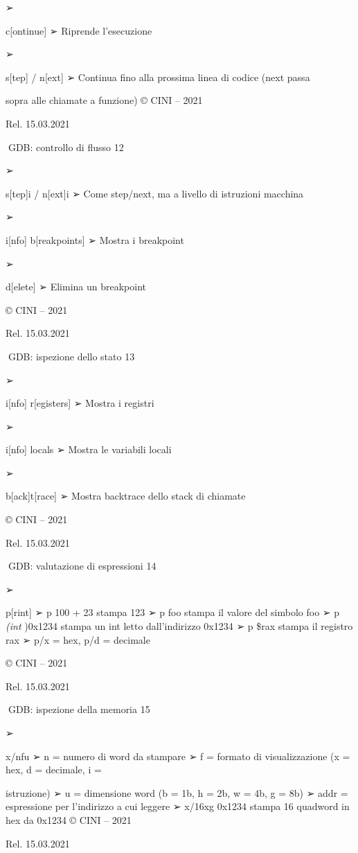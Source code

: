 \documentclass[11pt,a4paper]{article}
\begin{document}
➢

c{[}ontinue{]} ➢ Riprende l'esecuzione

➢

s{[}tep{]} / n{[}ext{]} ➢ Continua fino alla prossima linea di codice
(next passa

sopra alle chiamate a funzione) © CINI -- 2021

Rel. 15.03.2021

GDB: controllo di flusso 12

➢

s{[}tep{]}i / n{[}ext{]}i ➢ Come step/next, ma a livello di istruzioni
macchina

➢

i{[}nfo{]} b{[}reakpoints{]} ➢ Mostra i breakpoint

➢

d{[}elete{]} ➢ Elimina un breakpoint

© CINI -- 2021

Rel. 15.03.2021

GDB: ispezione dello stato 13

➢

i{[}nfo{]} r{[}egisters{]} ➢ Mostra i registri

➢

i{[}nfo{]} locals ➢ Mostra le variabili locali

➢

b{[}ack{]}t{[}race{]} ➢ Mostra backtrace dello stack di chiamate

© CINI -- 2021

Rel. 15.03.2021

GDB: valutazione di espressioni 14

➢

p{[}rint{]} ➢ p 100 + 23 stampa 123 ➢ p foo stampa il valore del simbolo
foo ➢ p \emph{(int })0x1234 stampa un int letto dall'indirizzo 0x1234 ➢
p \$rax stampa il registro rax ➢ p/x = hex, p/d = decimale

© CINI -- 2021

Rel. 15.03.2021

GDB: ispezione della memoria 15

➢

x/nfu ➢ n = numero di word da stampare ➢ f = formato di visualizzazione
(x = hex, d = decimale, i =

istruzione) ➢ u = dimensione word (b = 1b, h = 2b, w = 4b, g = 8b) ➢
addr = espressione per l'indirizzo a cui leggere ➢ x/16xg 0x1234 stampa
16 quadword in hex da 0x1234 © CINI -- 2021

Rel. 15.03.2021
\end{document}
